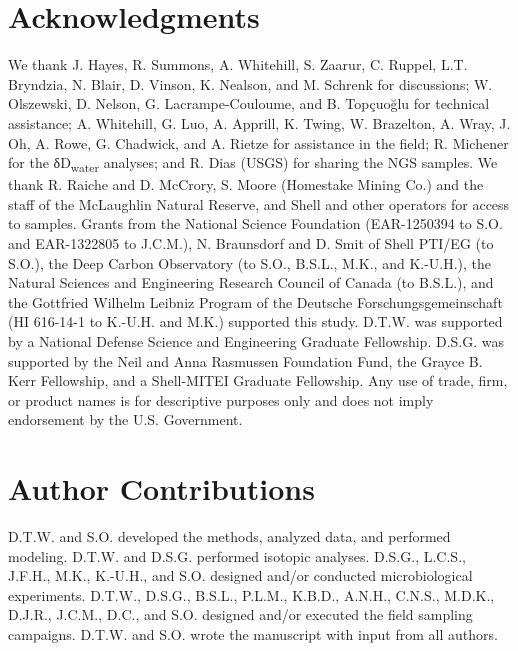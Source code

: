 \clearpage



\section{Acknowledgments}\label{acknowledgments}
We thank J. Hayes, R. Summons, A. Whitehill, S. Zaarur, C. Ruppel, L.T.
Bryndzia, N. Blair, D. Vinson, K. Nealson, and M. Schrenk for
discussions; W. Olszewski, D. Nelson, G. Lacrampe-Couloume, and B.
Topçuoğlu for technical assistance; A. Whitehill, G. Luo, A. Apprill, K.
Twing, W. Brazelton, A. Wray, J. Oh, A. Rowe, G. Chadwick, and A. Rietze
for assistance in the field; R. Michener for the δD\textsubscript{water}
analyses; and R. Dias (USGS) for sharing the NGS samples. We thank R.
Raiche and D. McCrory, S. Moore (Homestake Mining Co.) and the staff of
the McLaughlin Natural Reserve, and Shell and other operators for access
to samples. Grants from the National Science Foundation (EAR-1250394 to
S.O. and EAR-1322805 to J.C.M.), N. Braunsdorf and D. Smit of Shell
PTI/EG (to S.O.), the Deep Carbon Observatory (to S.O., B.S.L., M.K.,
and K.-U.H.), the Natural Sciences and Engineering Research Council of
Canada (to B.S.L.), and the Gottfried Wilhelm Leibniz Program of the
Deutsche Forschungsgemeinschaft (HI 616-14-1 to K.-U.H. and M.K.)
supported this study. D.T.W. was supported by a National Defense Science
and Engineering Graduate Fellowship. D.S.G. was supported by the Neil
and Anna Rasmussen Foundation Fund, the Grayce B. Kerr Fellowship, and a
Shell-MITEI Graduate Fellowship. Any use of trade, firm, or product
names is for descriptive purposes only and does not imply endorsement by
the U.S. Government.

\section*{Author Contributions}
D.T.W. and S.O. developed the methods,
analyzed data, and performed modeling. D.T.W. and D.S.G. performed
isotopic analyses. D.S.G., L.C.S., J.F.H., M.K., K.-U.H., and S.O.
designed and/or conducted microbiological experiments. D.T.W., D.S.G.,
B.S.L., P.L.M., K.B.D., A.N.H., C.N.S., M.D.K., D.J.R., J.C.M., D.C.,
and S.O. designed and/or executed the field sampling campaigns. D.T.W.
and S.O. wrote the manuscript with input from all authors.
%





